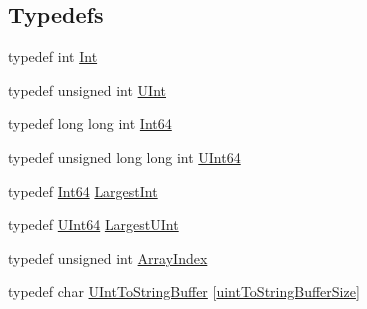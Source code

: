 \subsection*{Typedefs}
\begin{DoxyCompactItemize}
\item 
typedef int \hyperlink{namespace_json_a08122e8005b706d982e48cca1e2119c7}{Int}
\item 
typedef unsigned int \hyperlink{namespace_json_a800fb90eb6ee8d5d62b600c06f87f7d4}{U\-Int}
\item 
typedef long long int \hyperlink{namespace_json_ab7b47d2905da3b4ae60e4e800ec9ae5f}{Int64}
\item 
typedef unsigned long long int \hyperlink{namespace_json_a01f20bce8f8229f38ff890168c0e6452}{U\-Int64}
\item 
typedef \hyperlink{namespace_json_ab7b47d2905da3b4ae60e4e800ec9ae5f}{Int64} \hyperlink{namespace_json_a218d880af853ce786cd985e82571d297}{Largest\-Int}
\item 
typedef \hyperlink{namespace_json_a01f20bce8f8229f38ff890168c0e6452}{U\-Int64} \hyperlink{namespace_json_ae202ecad69725e23443f465e257456d0}{Largest\-U\-Int}
\item 
typedef unsigned int \hyperlink{namespace_json_a8048e741f2177c3b5d9ede4a5b8c53c2}{Array\-Index}
\item 
typedef char \hyperlink{namespace_json_a602bcf69c2042fb61c3b243cb16f04ca}{U\-Int\-To\-String\-Buffer} \mbox{[}\hyperlink{namespace_json_a0c5f614b019f20b4598dcaec09d9e820ae4f2008c7919f20d81286121d1374424}{uint\-To\-String\-Buffer\-Size}\mbox{]}
\end{DoxyCompactItemize}

